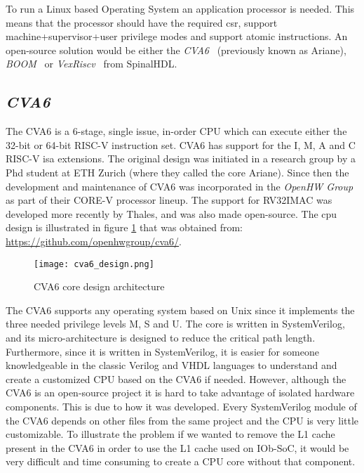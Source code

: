 To run a Linux based Operating System an application processor is needed. This means that the processor should have the required \acrfull{csr}, support \acrshort{machine}+\acrshort{supervisor}+\acrshort{user} privilege modes and support atomic instructions. An open-source solution would be either the \textit{CVA6}~\cite{zaruba2019cost} (previously known as Ariane), \textit{BOOM}~\cite{zhaosonicboom} or \textit{VexRiscv}~\cite{vexriscv} from SpinalHDL.

\subsection{\textit{CVA6}}
The CVA6 is a 6-stage, single issue, in-order CPU which can execute either the 32-bit or 64-bit RISC-V instruction set. CVA6 has support for the I, M, A and C RISC-V \acrshort{isa} extensions. The original design was initiated in a research group by a Phd student at ETH Zurich (where they called the core Ariane). Since then the development and maintenance of CVA6 was incorporated in the \textit{OpenHW Group} as part of their CORE-V processor lineup. The support for RV32IMAC was developed more recently by Thales, and was also made open-source. The \acrshort{cpu} design is illustrated in figure \ref{fig:cva6_design} that was obtained from: \url{https://github.com/openhwgroup/cva6/}.

\begin{figure}[!h]
    \centering
    \texttt{[image: cva6\_design.png]}
    \caption{CVA6 core design architecture}
    \label{fig:cva6_design}
\end{figure}

The CVA6 supports any operating system based on Unix since it implements the three needed privilege levels M, S and U. The core is written in SystemVerilog, and its micro-architecture is designed to reduce the critical path length. Furthermore, since it is written in SystemVerilog, it is easier for someone knowledgeable in the classic Verilog and VHDL languages to understand and create a customized CPU based on the CVA6 if needed. However, although the CVA6 is an open-source project it is hard to take advantage of isolated hardware components. This is due to how it was developed. Every SystemVerilog module of the CVA6 depends on other files from the same project and the CPU is very little customizable. To illustrate the problem if we wanted to remove the L1 cache present in the CVA6 in order to use the L1 cache used on IOb-SoC, it would be very difficult and time consuming to create a CPU core without that component.

